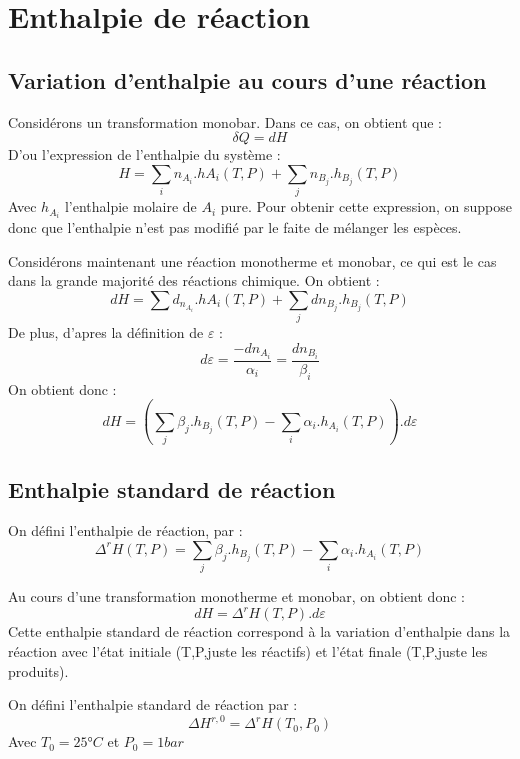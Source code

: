 \section{Enthalpie de réaction}
\subsection{Variation d'enthalpie au cours d'une réaction}
\begin{prop}
Considérons un transformation monobar. Dans ce cas, on obtient que : 
$$\delta Q = dH$$
D'ou l'expression de l'enthalpie du système : 
$$H = \sum_i n_{A_i}.h{A_i}(T,P) + \sum_j n_{B_j}.h_{B_j}(T,P)$$
Avec $h_{A_i}$ l'enthalpie molaire de $A_i$ pure. Pour obtenir cette expression, on suppose donc que l'enthalpie n'est pas modifié par le faite de mélanger les espèces.\\ 
\end{prop}
\begin{prop}
Considérons maintenant une réaction monotherme et monobar, ce qui est le cas dans la grande majorité des réactions chimique. On obtient : 
$$dH = \sum d_{n_{A_i}}.h{A_i}(T,P) + \sum_j dn_{B_j}.h_{B_j}(T,P)$$
De plus, d'apres la définition de $\varepsilon$ : 
$$d\varepsilon = \dfrac{-dn_{A_i}}{\alpha_i} = \dfrac{dn_{B_i}}{\beta_i}$$
On obtient donc : 
$$dH = (\sum_j \beta_j.h_{B_j}(T,P) - \sum_i \alpha_i.h_{A_i}(T,P)).d\varepsilon$$
\end{prop}
\subsection{Enthalpie standard de réaction}
\begin{de}
On défini l'enthalpie de réaction, par :
$$\Delta^r H(T,P) = \sum_j \beta_j.h_{B_j}(T,P) - \sum_i \alpha_i.h_{A_i}(T,P)$$
\end{de}
\begin{prop}
Au cours d'une transformation monotherme et monobar, on obtient donc : 
$$dH = \Delta^r H(T,P).d\varepsilon$$
Cette enthalpie standard de réaction correspond à la variation d'enthalpie dans la réaction avec l'état initiale (T,P,juste les réactifs) et l'état finale (T,P,juste les produits).
\end{prop}
\begin{de}
On défini l'enthalpie standard de réaction par :
$$\Delta H^{r,0} = \Delta^r H(T_0,P_0)$$
Avec $T_0 = 25°C$ et $P_0 = 1 bar$
\end{de}
